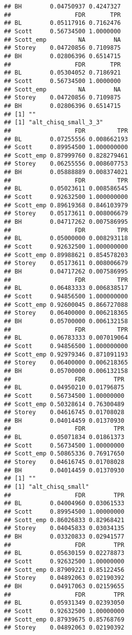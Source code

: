 \documentclass{article}\usepackage[]{graphicx}\usepackage[]{color}
\makeatletter
\newenvironment{kframe}{%
 \def\at@end@of@kframe{}%
 \ifinner\ifhmode%
  \def\at@end@of@kframe{\end{minipage}}%
  \begin{minipage}{\columnwidth}%
 \fi\fi%
 \def\FrameCommand##1{\hskip\@totalleftmargin \hskip-\fboxsep
 \colorbox{shadecolor}{##1}\hskip-\fboxsep
     \hskip-\linewidth \hskip-\@totalleftmargin \hskip\columnwidth}%
 \MakeFramed {\advance\hsize-\width
   \@totalleftmargin\z@ \linewidth\hsize
   \@setminipage}}%
 {\par\unskip\endMakeFramed%
 \at@end@of@kframe}
\newenvironment{knitrout}{}{} %
\makeatother
\begin{document}
\begin{knitrout}
\begin{kframe}
\begin{verbatim}
## BH        0.04750937 0.4247327
##                  FDR       TPR
## BL        0.05117916 0.7162476
## Scott     0.56734500 1.0000000
## Scott_emp         NA        NA
## Storey    0.04720856 0.7109875
## BH        0.02806396 0.6514715
##                  FDR       TPR
## BL        0.05304052 0.7186921
## Scott     0.56734500 1.0000000
## Scott_emp         NA        NA
## Storey    0.04720856 0.7109875
## BH        0.02806396 0.6514715
## [1] ""
## [1] "alt_chisq_small_3_3"
##                  FDR         TPR
## BL        0.07255556 0.008662193
## Scott     0.89954500 1.000000000
## Scott_emp 0.87999760 0.828279461
## Storey    0.06255556 0.008607753
## BH        0.05888889 0.008374021
##                  FDR         TPR
## BL        0.05023611 0.008586545
## Scott     0.92632500 1.000000000
## Scott_emp 0.89619368 0.846103979
## Storey    0.05173611 0.008006679
## BH        0.04717262 0.007586995
##                  FDR         TPR
## BL        0.05000000 0.008293118
## Scott     0.92632500 1.000000000
## Scott_emp 0.89988621 0.854578203
## Storey    0.05173611 0.008006679
## BH        0.04717262 0.007586995
##                  FDR         TPR
## BL        0.06483333 0.006838517
## Scott     0.94856500 1.000000000
## Scott_emp 0.92600045 0.866727088
## Storey    0.06400000 0.006218365
## BH        0.05700000 0.006132158
##                  FDR         TPR
## BL        0.06783333 0.007019064
## Scott     0.94856500 1.000000000
## Scott_emp 0.92979346 0.871091193
## Storey    0.06400000 0.006218365
## BH        0.05700000 0.006132158
##                  FDR        TPR
## BL        0.04950210 0.01796875
## Scott     0.56734500 1.00000000
## Scott_emp 0.50328614 0.76300489
## Storey    0.04616745 0.01708028
## BH        0.04014459 0.01370930
##                  FDR        TPR
## BL        0.05071834 0.01861373
## Scott     0.56734500 1.00000000
## Scott_emp 0.50865336 0.76917650
## Storey    0.04616745 0.01708028
## BH        0.04014459 0.01370930
## [1] ""
## [1] "alt_chisq_small"
##                  FDR        TPR
## BL        0.04004960 0.03061533
## Scott     0.89954500 1.00000000
## Scott_emp 0.86026833 0.82968421
## Storey    0.04045833 0.03034135
## BH        0.03320833 0.02941577
##                  FDR        TPR
## BL        0.05630159 0.02278873
## Scott     0.92632500 1.00000000
## Scott_emp 0.87909221 0.85122456
## Storey    0.04892063 0.02190392
## BH        0.04917063 0.02159655
##                  FDR        TPR
## BL        0.05931349 0.02393050
## Scott     0.92632500 1.00000000
## Scott_emp 0.87939675 0.85768769
## Storey    0.04892063 0.02190392

\end{verbatim}
\end{kframe}
\end{knitrout}
\end{document}
